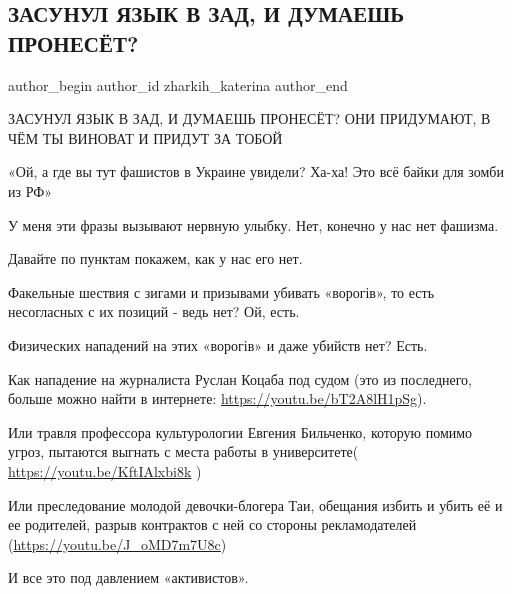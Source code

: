  
 
 
 
 
 
\subsection{ЗАСУНУЛ ЯЗЫК В ЗАД, И ДУМАЕШЬ ПРОНЕСЁТ?}
\label{sec:27_01_2021.fb.zharkih_katerina.1.zasunul_jazyk_v_zad}
 
\ifcmt
 author_begin
   author_id zharkih_katerina
 author_end
\fi

ЗАСУНУЛ ЯЗЫК В ЗАД, И ДУМАЕШЬ ПРОНЕСЁТ? ОНИ ПРИДУМАЮТ, В ЧЁМ ТЫ ВИНОВАТ И
ПРИДУТ ЗА ТОБОЙ

«Ой, а где вы тут фашистов в Украине увидели? Ха-ха! Это всё байки для зомби из
РФ» 

У меня эти фразы вызывают нервную улыбку. Нет, конечно у нас нет фашизма.

Давайте по пунктам покажем, как у нас его нет. 

Факельные шествия с зигами и призывами убивать «ворогів», то есть несогласных с
их позиций - ведь нет? Ой, есть.


Физических нападений на этих «ворогів» и даже убийств нет? Есть. 

Как нападение на журналиста Руслан Коцаба  под судом (это из последнего, больше
можно найти в интернете: \url{https://youtu.be/bT2A8lH1pSg}). 

Или травля профессора культурологии Евгения Бильченко, которую помимо угроз,
пытаются выгнать с места работы в университете( \url{https://youtu.be/KftIAlxbi8k} )

Или преследование молодой девочки-блогера Таи, обещания избить и убить её и ее
родителей, разрыв контрактов с ней со стороны рекламодателей
(\url{https://youtu.be/J_oMD7m7U8c})

И все это под давлением «активистов».

